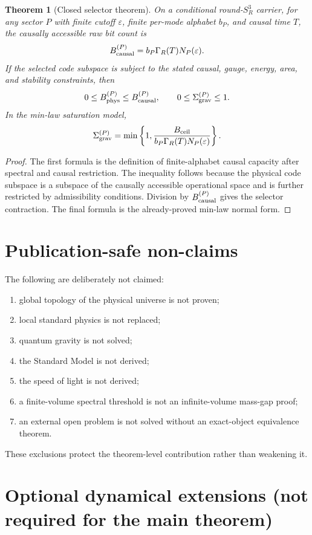 \documentclass[11pt,a4paper]{article}
\newtheorem{theorem}{Theorem}[section]
\begin{document}
\begin{theorem}[Closed selector theorem]
On a conditional round-$S^3_R$ carrier, for any sector $P$ with finite cutoff $\varepsilon$, finite per-mode alphabet $b_P$, and causal time $T$, the causally accessible raw bit count is
\[
B_{\rm causal}^{(P)}=b_P\Gamma_R(T)N_P(\varepsilon).
\]
If the selected code subspace is subject to the stated causal, gauge, energy, area, and stability constraints, then
\[
0\le B_{\rm phys}^{(P)}\le B_{\rm causal}^{(P)},
\qquad
0\le\Sigma_{\rm grav}^{(P)}\le1.
\]
In the min-law saturation model,
\[
\Sigma_{\rm grav}^{(P)}=
\min\left\{1,\frac{B_{\rm ceil}}{b_P\Gamma_R(T)N_P(\varepsilon)}\right\}.
\]
\end{theorem}
\begin{proof}
The first formula is the definition of finite-alphabet causal capacity after spectral and causal restriction.  The inequality follows because the physical code subspace is a subspace of the causally accessible operational space and is further restricted by admissibility conditions.  Division by $B_{\rm causal}^{(P)}$ gives the selector contraction.  The final formula is the already-proved min-law normal form.\end{proof}

\section{Publication-safe non-claims}

The following are deliberately not claimed:
\begin{enumerate}
\item global topology of the physical universe is not proven;
\item local standard physics is not replaced;
\item quantum gravity is not solved;
\item the Standard Model is not derived;
\item the speed of light is not derived;
\item a finite-volume spectral threshold is not an infinite-volume mass-gap proof;
\item an external open problem is not solved without an exact-object equivalence theorem.
\end{enumerate}
These exclusions protect the theorem-level contribution rather than weakening it.

\section{Optional dynamical extensions (not required for the main theorem)}
\label{app:optional-dynamics}
\end{document}
